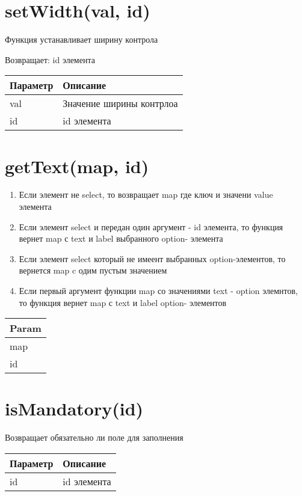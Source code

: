 \hypertarget{setwidthval-id}{%
\section{setWidth(val, id)}\label{setwidthval-id}}

Функция устанавливает ширину контрола

Возвращает: id элемента

\begin{longtable}[]{@{}ll@{}}
\toprule
Параметр & Описание\tabularnewline
\midrule
\endhead
val & Значение ширины контрлоа\tabularnewline
id & id элемента\tabularnewline
\bottomrule
\end{longtable}

\hypertarget{gettextmap-id-dlmap}{%
\section{getText(map, id)}\label{gettextmap-id-dlmap}}

\begin{enumerate}
\def\labelenumi{\arabic{enumi}.}
\tightlist
\item
  Если элемент не select, то возвращает map где ключ и значени value
  элемента
\item
  Если элемент select и передан один аргумент - id элемента, то функция
  вернет map с text и label выбранного option- элемента
\item
  Если элемент select который не имеент выбранных option-элементов, то
  вернется map c одим пустым значением
\item
  Если первый аргумент функции map со значениями text - option элемнтов,
  то функция вернет map с text и label option- элементов
\end{enumerate}


\begin{longtable}[]{@{}l@{}}
\toprule
Param\tabularnewline
\midrule
\endhead
map\tabularnewline
id\tabularnewline
\bottomrule
\end{longtable}

\hypertarget{ismandatoryid-boolean}{%
\section{isMandatory(id)}\label{ismandatoryid-boolean}}

Возвращает обязательно ли поле для заполнения


\begin{longtable}[]{@{}ll@{}}
\toprule
Параметр & Описание\tabularnewline
\midrule
\endhead
id & id элемента\tabularnewline
\bottomrule
\end{longtable}

